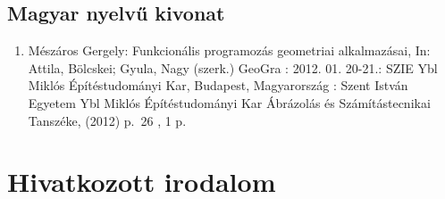 \documentclass[12pt,magyar,a4paper,oneside]{scrreprt}
\providecommand{\tightlist}{%
  \setlength{\itemsep}{0pt}\setlength{\parskip}{0pt}}
\begin{document}
\hypertarget{magyar-nyelvux171-kivonat}{%
\section*{Magyar nyelvű kivonat}\label{magyar-nyelvux171-kivonat}}

\begin{enumerate}
\def\labelenumi{\arabic{enumi}.}
\tightlist
\item
  Mészáros Gergely: Funkcionális programozás geometriai alkalmazásai,
  In: Attila, Bölcskei; Gyula, Nagy (szerk.) GeoGra : 2012. 01. 20-21.:
  SZIE Ybl Miklós Építéstudományi Kar, Budapest, Magyarország : Szent
  István Egyetem Ybl Miklós Építéstudományi Kar Ábrázolás és
  Számítástecnikai Tanszéke, (2012) p.~26 , 1 p.
\end{enumerate}

\hypertarget{hivatkozott-irodalom}{%
\chapter*{Hivatkozott irodalom}\label{hivatkozott-irodalom}}

\end{document}
